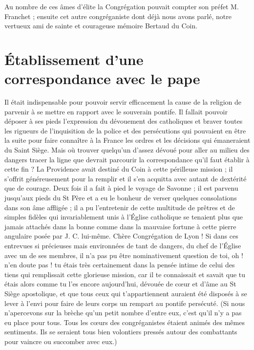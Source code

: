 Au nombre de ces âmes d'élite la Congrégation pouvait compter son préfet M. Franchet ; ensuite cet autre congréganiste dont déjà nous avons parlé, notre vertueux ami de sainte et courageuse mémoire Bertaud du Coin.

\section*{Établissement d'une correspondance avec le pape}
Il était indispensable pour pouvoir servir efficacement la cause de la religion de parvenir à se mettre en rapport avec le souverain pontife. Il fallait pouvoir déposer à ses pieds l'expression du dévouement des catholiques et braver toutes les rigueurs de l'inquisition de la police et des persécutions qui pouvaient en être la suite pour faire connaître à la France les ordres et les décisions qui émaneraient du Saint Siège. Mais où trouver quelqu'un d'assez dévoué pour aller au milieu des dangers tracer la ligne que devrait parcourir la correspondance qu'il faut établir à cette fin ? La Providence avait destiné du Coin à cette périlleuse mission ; il s'offrit généreusement pour la remplir et il s'en acquitta avec autant de dextérité que de courage. Deux fois il a fait à pied le voyage de Savonne ; il est parvenu jusqu'aux pieds du St Père et a eu le bonheur de verser quelques consolations dans son âme affligée ; il a pu l'entretenir de cette multitude de prêtres et de simples fidèles qui invariablement unis à l'Église catholique se tenaient plus que jamais attachés dans la bonne comme dans la mauvaise fortune à cette pierre angulaire posée par J. C. lui-même. Chère Congrégation de Lyon ! Si dans ces entrevues
si précieuses mais environnées de tant de dangers, du chef de l'Église avec un de ses membres, il n'a pas pu être nominativement question de toi, oh ! n'en doute pas ! tu étais très certainement dans la pensée intime de celui des tiens qui remplissait cette glorieuse mission, car il te connaissait et savait que tu étais alors comme tu l'es encore aujourd'hui, dévouée de cœur et d'âme au St Siège apostolique, et que tous ceux qui t'appartiennent auraient été disposés à se lever à l'envi pour faire de leurs corps un rempart au pontife persécuté. (Si nous n'apercevons sur la brèche qu'un petit nombre d'entre eux, c'est qu'il n'y a pas eu place pour tous. Tous les cœurs des congréganistes étaient animés des mêmes sentiments. Ils se seraient tous bien volontiers pressés autour des combattants pour vaincre ou succomber avec eux.)

